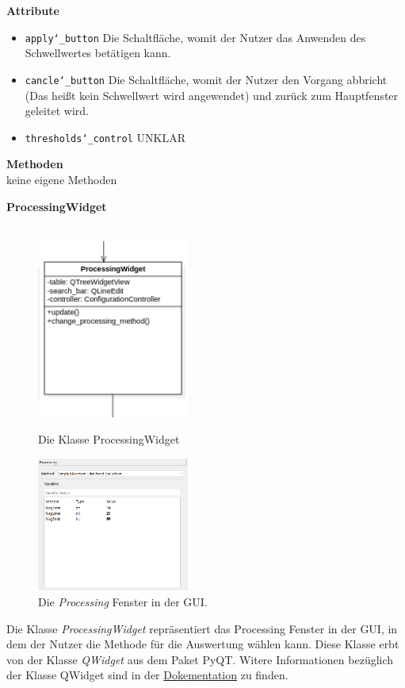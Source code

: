 \documentclass{article}
\begin{document}
\textbf{{Attribute}}
\begin{itemize}
\item \texttt{apply\char`_button} \newline Die Schaltfläche, womit der Nutzer das Anwenden des Schwellwertes betätigen kann.
\item \texttt{cancle\char`_button} \newline Die Schaltfläche, womit der Nutzer den Vorgang abbricht (Das heißt kein Schwellwert wird angewendet) und zurück zum Hauptfenster geleitet wird.
    \item \texttt{thresholds\char`_control} \newline UNKLAR
\end{itemize}

\textbf{{Methoden}}
\\keine eigene Methoden

\newpage
\textbf{\large{ProcessingWidget}}\\\\
\begin{figure}[H]%
    \centering
    \begin{minipage}[b]{0.4\textwidth}
        \includegraphics[width=5cm]{entwurf/Entwurf_dokument/img/Alissa/ProcessingWidget.png}
        \caption{Die Klasse ProcessingWidget}
    \end{minipage}
    \hfill
    \begin{minipage}[b]{0.4\textwidth}
        \includegraphics[width=5cm]{entwurf/Entwurf_dokument/img/Alissa/Processing.png} 
    \caption{Die \textit{Processing} Fenster in der GUI.}
    \end{minipage}
\end{figure}
Die Klasse \textit{ProcessingWidget} repräsentiert das Processing Fenster in der GUI, in dem der Nutzer die Methode für die Auswertung wählen kann. Diese Klasse erbt von der Klasse \textit{QWidget} aus dem Paket PyQT. Witere Informationen bezüglich der Klasse QWidget sind in der \href{https://doc.qt.io/qt-6/qwidget.html}{Dokementation} zu finden.
\newline \newline
\end{document}
